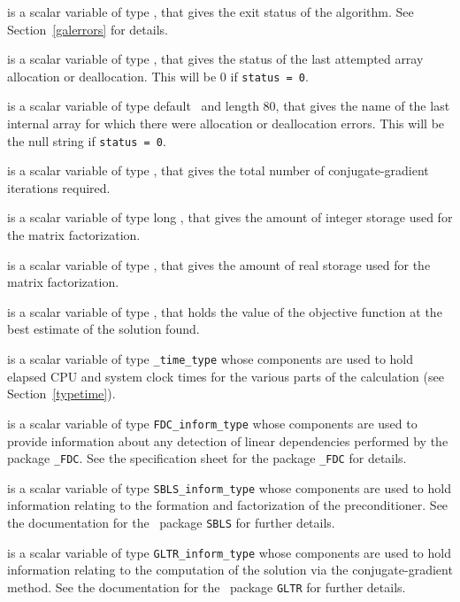 \begin{description}

 is a scalar variable of type \integer, that gives the
exit status of the algorithm. 
See Section~\ref{galerrors} 
for details.

 is a scalar variable of type \integer, that gives
the status of the last attempted array allocation or deallocation.
This will be 0 if {\tt status = 0}.

 is a scalar variable of type default \character\
and length 80, that  gives the name of the last internal array 
for which there were allocation or deallocation errors.
This will be the null string if {\tt status = 0}. 

 is a scalar variable of type \integer, that gives the
total number of conjugate-gradient iterations required.

 is a scalar variable of type long
\integer, that gives the amount of integer storage used for the matrix 
factorization.

 is a scalar variable of type \longinteger, 
that gives the amount of real storage used for the matrix factorization.

 is a scalar variable of type \realdp, that holds the
value of the objective function at the best estimate of the solution found.

 is a scalar variable of type {\tt \packagename\_time\_type} 
whose components are used to hold elapsed CPU and system clock times for the 
various parts of the calculation (see Section~\ref{typetime}).

 is a scalar variable of type {\tt FDC\_inform\_type}
whose components are used to provide information about any detection of linear 
dependencies performed by the package {\tt \libraryname\_FDC}. See the
specification sheet for the package {\tt \libraryname\_FDC} for details.

 is a scalar variable of type {\tt SBLS\_inform\_type} 
whose components are used to hold information relating to the 
formation and factorization of the preconditioner. See the
documentation for the \galahad\ package {\tt SBLS} for further details.

 is a scalar variable of type {\tt GLTR\_inform\_type} 
whose components are used to hold information relating to the 
computation of the solution via the conjugate-gradient method. See the
documentation for the \galahad\ package {\tt GLTR} for further details.

\end{description}
